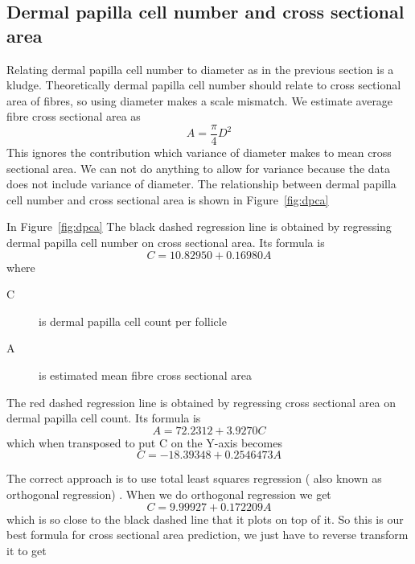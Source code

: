 \documentclass[titlepage]{article}  %
\begin{document}
\subsection{Dermal papilla cell number and cross sectional area}
Relating dermal papilla cell number to diameter as in the previous section is a kludge. Theoretically dermal papilla cell number should relate to cross sectional area of fibres, so using diameter makes a scale mismatch. We estimate average fibre cross sectional area as
\begin{displaymath}
A = \frac{\pi}{4} D^{2}
\end{displaymath}
This ignores the contribution which variance of diameter makes to mean cross sectional area. We can not do anything to allow for variance because the data does not include variance of diameter.
The relationship between dermal papilla cell number and cross sectional area is shown in Figure~\ref{fig:dpca}

In Figure~\ref{fig:dpca} The black dashed regression line is obtained by regressing dermal papilla cell number on cross sectional area. Its formula is
\begin{displaymath}
C = 10.82950 + 0.16980 A
\end{displaymath}
where
\begin{description}
\item[C] is dermal papilla cell count per follicle
\item[A] is estimated mean fibre cross sectional area
\end{description}

The red dashed regression line is obtained by regressing cross sectional area on dermal papilla cell count. Its formula is
\begin{displaymath}
A = 72.2312 + 3.9270 C
\end{displaymath}
which when transposed to put C on the Y-axis becomes
\begin{displaymath}
C = -18.39348 + 0.2546473 A
\end{displaymath}

The correct approach is to use total least squares regression ( also known as orthogonal regression) . When we do orthogonal regression we get
\begin{displaymath}
C = 9.99927+ 0.172209 A
\end{displaymath}
which is so close to the black dashed line that it plots on top of it.
So this is our best formula for cross sectional area prediction, we just have to reverse transform it to get
\end{document}
